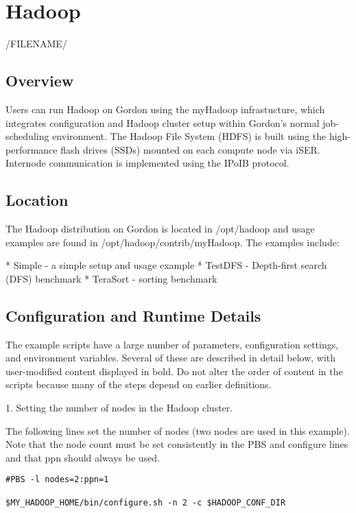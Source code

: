 \section{Hadoop}
/FILENAME/

\subsection{Overview}

Users can run Hadoop on Gordon using the myHadoop infrastucture, which
integrates configuration and Hadoop cluster setup within Gordon's
normal job-scheduling environment. The Hadoop File System (HDFS) is
built using the high-performance flash drives (SSDs) mounted on each
compute node via iSER. Internode communication is implemented using
the IPoIB protocol.

\subsection{Location}

The Hadoop distribution on Gordon is located in /opt/hadoop and usage
examples are found in /opt/hadoop/contrib/myHadoop. The examples
include:

* Simple - a simple setup and usage example
* TestDFS - Depth-first search (DFS) benchmark
* TeraSort - sorting benchmark

\subsection{Configuration and Runtime Details}

The example scripts have a large number of parameters, configuration
settings, and environment variables. Several of these are described in
detail below, with user-modified content displayed in bold. Do not
alter the order of content in the scripts because many of the steps
depend on earlier definitions.

1. Setting the number of nodes in the Hadoop cluster.

The following lines set the number of nodes (two nodes are used in
this example). Note that the node count must be set consistently in
the PBS and configure lines and that ppn should always be used.

\begin{verbatim}
#PBS -l nodes=2:ppn=1

$MY_HADOOP_HOME/bin/configure.sh -n 2 -c $HADOOP_CONF_DIR
\end{verbatim}

